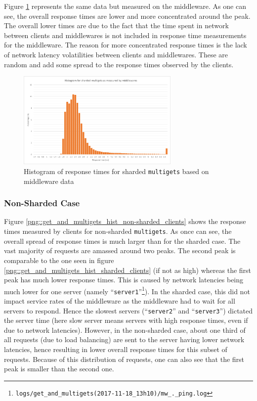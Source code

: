\documentclass[11pt,a4paper]{article}
\begin{document}
Figure \ref{png::get_and_multigets_hist_sharded_mws} represents the same data but measured on the middleware. As one can see, the overall response times are lower and more concentrated around the peak. The overall lower times are due to the fact that the time spent in network between clients and middlewares is not included in response time measurements for the middleware. The reason for more concentrated response times is the lack of network latency volatilities between clients and middlewares. These are random and add some spread to the response times observed by the clients.

\begin{figure}[!h]
    \centering
    \includegraphics[width=0.7\textwidth]{processing/graphics/get_and_multigets_hist_sharded_mws.png}
    \caption{Histogram of response times for sharded \texttt{multigets} based on middleware data}
    \label{png::get_and_multigets_hist_sharded_mws}
\end{figure}

\subsubsection{Non-Sharded Case}
Figure \ref{png::get_and_multigets_hist_non-sharded_clients} shows the response times measured by clients for non-sharded \texttt{multigets}. As once can see, the overall spread of response times is much larger than for the sharded case. The vast majority of requests are amassed around two peaks. The second peak is comparable to the one seen in figure \ref{png::get_and_multigets_hist_sharded_clients} (if not as high) whereas the first peak has much lower response times. This is caused by network latencies being much lower for one server (namely ``\texttt{server1}''\footnote{\texttt{logs/get_and_multigets(2017-11-18_13h10)/mw_._ping.log}}). In the sharded case, this did not impact service rates of the middleware as the middleware had to wait for all servers to respond. Hence the slowest servers (``\texttt{server2}'' and ``\texttt{server3}'') dictated the server time (here slow server means servers with high response times, even if due to network latencies). However, in the non-sharded case, about one third of all requests (due to load balancing) are sent to the server having lower network latencies, hence resulting in lower overall response times for this subset of requests. Because of this distribution of requests, one can also see that the first peak is smaller than the second one.
\end{document}
